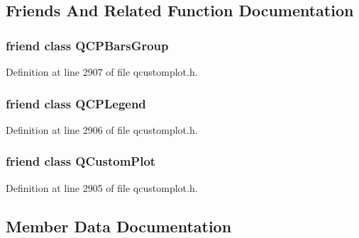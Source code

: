 \subsection{Friends And Related Function Documentation}
\hypertarget{class_q_c_p_bars_ae1051b4d58a2786cb420367a586e2fee}{}
\subsubsection[{Q\+C\+P\+Bars\+Group}]{\setlength{\rightskip}{0pt plus 5cm}friend class {\bf Q\+C\+P\+Bars\+Group}\hspace{0.3cm}{\ttfamily [friend]}}\label{class_q_c_p_bars_ae1051b4d58a2786cb420367a586e2fee}


Definition at line 2907 of file qcustomplot.\+h.

\hypertarget{class_q_c_p_bars_a8429035e7adfbd7f05805a6530ad5e3b}{}
\subsubsection[{Q\+C\+P\+Legend}]{\setlength{\rightskip}{0pt plus 5cm}friend class {\bf Q\+C\+P\+Legend}\hspace{0.3cm}{\ttfamily [friend]}}\label{class_q_c_p_bars_a8429035e7adfbd7f05805a6530ad5e3b}


Definition at line 2906 of file qcustomplot.\+h.

\hypertarget{class_q_c_p_bars_a1cdf9df76adcfae45261690aa0ca2198}{}
\subsubsection[{Q\+Custom\+Plot}]{\setlength{\rightskip}{0pt plus 5cm}friend class {\bf Q\+Custom\+Plot}\hspace{0.3cm}{\ttfamily [friend]}}\label{class_q_c_p_bars_a1cdf9df76adcfae45261690aa0ca2198}


Definition at line 2905 of file qcustomplot.\+h.



\subsection{Member Data Documentation}
\hypertarget{class_q_c_p_bars_a0c1c46076c41a478dbb373cfd35929aa}{}
